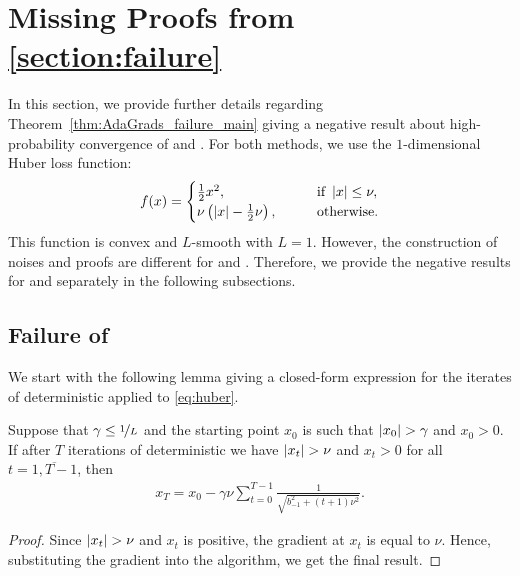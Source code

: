 \documentclass{article}
\begin{document}
\section{Missing Proofs from \cref{section:failure}}\label{appendix:proofs_failure}

In this section, we provide further details regarding Theorem~\ref{thm:AdaGrads_failure_main} giving a negative result about high-probability convergence of  and . For both methods, we use the $1$-dimensional Huber loss function:
\begin{align*}
    f(x) = \begin{cases}
        \frac{1}{2}x^2, \qquad & \text{if } \left\lvert x\right\rvert \leq \nu,\\
        \nu\left(\left\lvert x\right\rvert - \frac{1}{2}\nu\right), \qquad &\text{otherwise.}
    \end{cases}
\end{align*}
This function is convex and $L$-smooth with $L = 1$. However, the construction of noises and proofs are different for  and . Therefore, we provide the negative results for  and  separately in the following subsections.


\subsection{Failure of }

We start with the following lemma giving a closed-form expression for the iterates of deterministic  applied to \eqref{eq:huber}.

\begin{lemma}
\label{lem:analytical-point}
    Suppose that $\gamma \leq \nicefrac{1}{L}$ and the starting point $x_0$ is such that $\left\lvert x_0\right\rvert > \gamma$ and $x_0 > 0$. If after $T$ iterations of deterministic  we have $\left\lvert x_t\right\rvert > \nu$ and $x_t > 0$ for all $t=\overline{1, T-1}$, then
    \begin{align*}
        x_T = x_0 - \gamma\nu\sum\limits_{t = 0}^{T-1}\frac{1}{\sqrt{b_{-1}^2 + (t+1)\nu^2}}.
    \end{align*}
\end{lemma}
\begin{proof}
    Since $\left\lvert x_t\right\rvert > \nu$ and $x_t$ is positive, the gradient at $x_t$ is equal to $\nu$. Hence,  substituting the gradient into the algorithm, we get the final result.
\end{proof}
\end{document}
